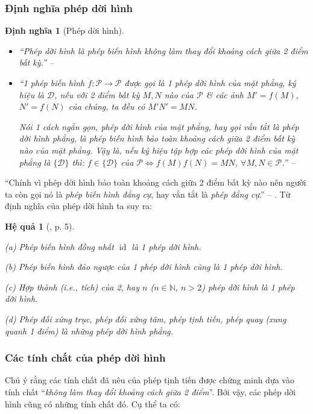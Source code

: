 \documentclass[oneside]{book}
\numberwithin{equation}{section}
\newtheorem{hequa}{Hệ quả}[section]
\newtheorem{dinhnghia}{Định nghĩa}[section]
\begin{document}
\subsubsection{Định nghĩa phép dời hình}

\begin{dinhnghia}[Phép dời hình]
	\begin{itemize}
		\item ``\emph{Phép dời hình} là phép biến hình không làm thay đổi khoảng cách giữa 2 điểm bất kỳ.'' -- \cite[p. 8]{SGK_Toan_11_hinh_hoc_nang_cao}
		\item ``1 phép biến hình $f:\mathcal{P}\to\mathcal{P}$ được gọi là 1 \emph{phép dời hình} của mặt phẳng, ký hiệu là $\mathcal{D}$, nếu với 2 điểm bất kỳ $M,N$ nào của $\mathcal{P}$ \& các ảnh $M' = f(M)$, $N' = f(N)$ của chúng, ta đều có $M'N' = MN$.
		
		Nói 1 cách ngắn gọn, phép dời hình của mặt phẳng, hay gọi vắn tắt là \emph{phép dời hình phẳng}, là phép biến hình bảo toàn khoảng cách giữa 2 điểm bất kỳ nào của mặt phẳng. Vậy là, nếu ký hiệu tập hợp các phép dời hình của mặt phẳng là $\{\mathcal{D}\}$ thì: $f\in\{\mathcal{D}\}$ của $\mathcal{P}\Leftrightarrow f(M)f(N) = MN$, $\forall M,N\in\mathcal{P}$.'' -- \cite[p. 5]{TL_chuyen_Toan_Hinh_Hoc_11}
	\end{itemize}
\end{dinhnghia}
``Chính vì phép dời hình bảo toàn khoảng cách giữa 2 điểm bất kỳ nào nên người ta còn gọi nó là \textit{phép biến hình đẳng cự}, hay vắn tắt là \textit{phép đẳng cự}.'' -- \cite[p. 5]{TL_chuyen_Toan_Hinh_Hoc_11}. Từ định nghĩa của phép dời hình ta suy ra:

\begin{hequa}[\cite{TL_chuyen_Toan_Hinh_Hoc_11}, p. 5]
	\begin{enumerate*}
		\item[(a)] Phép biến hình đồng nhất $\operatorname{id}$ là 1 phép dời hình.
		\item[(b)] Phép biến hình đảo ngược của 1 phép dời hình cũng là 1 phép dời hình.
		\item[(c)] Hợp thành (i.e., tích) của 2, hay $n$ ($n\in\mathbb{N}$, $n > 2$) phép dời hình là 1 phép dời hình.
		\item[(d)] Phép đối xứng trục, phép đối xứng tâm, phép tịnh tiến, phép quay (xung quanh 1 điểm) là những phép dời hình phẳng.
	\end{enumerate*}
\end{hequa}

\subsubsection{Các tính chất của phép dời hình}
Chú ý rằng các tính chất đã nêu của phép tịnh tiến được chứng minh dựa vào tính chất ``\textit{không làm thay đổi khoảng cách giữa 2 điểm}''. Bởi vậy, các phép dời hình cũng có những tính chất đó. Cụ thể ta có:
\end{document}
